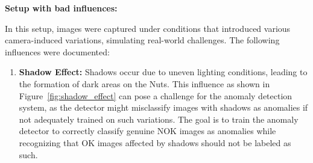 \documentclass[12pt,DIV14,BCOR12mm,a4paper,footinclude=false,headinclude,parskip=half-,twoside,openright,cleardoublepage=empty,toc=index,bibliography=totoc,listof=totoc]{scrreprt}
\numberwithin{equation}{chapter}
\begin{document}
\textbf{Setup with bad influences:}

In this setup, images were captured under conditions that introduced various camera-induced variations, simulating real-world challenges. The following influences were documented:

\begin{enumerate}
	\item \textbf{Shadow Effect:} Shadows occur due to uneven lighting conditions, leading to the formation of dark areas on the Nuts. This influence as shown in Figure~\ref{fig:shadow_effect} can pose a challenge for the anomaly detection system, as the detector might misclassify images with shadows as anomalies if not adequately trained on such variations. The goal is to train the anomaly detector to correctly classify genuine NOK images as anomalies while recognizing that OK images affected by shadows should not be labeled as such.


\end{enumerate}
\end{document}

